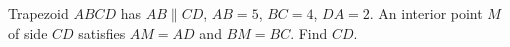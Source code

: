 Trapezoid $ABCD$ has $AB\parallel CD$, $AB=5$, $BC=4$, $DA=2$. An interior point $M$ of side $CD$ satisfies $AM=AD$ and $BM=BC$. Find $CD$.
